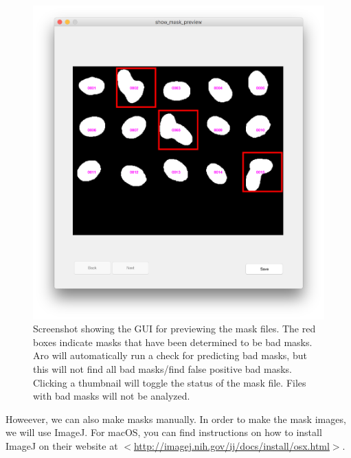 \documentclass[titlepage,11pt]{article}
\begin{document}
\begin{figure}
\centering
\includegraphics[scale=0.45]{show_mask_preview.png}
\caption{Screenshot showing the GUI for previewing the mask files. The red boxes indicate masks that have been determined to be bad masks. Aro will automatically run a check for predicting bad masks, but this will not find all bad masks/find false positive bad masks. Clicking a thumbnail will toggle the status of the mask file. Files with bad masks will not be analyzed.}
\label{fig:showmaskpreview}
\end{figure}

Howeever, we can also make masks manually. In order to make the mask images, we will use ImageJ. For macOS, you can find instructions on how to install ImageJ on their website at $<$\href{http://imagej.nih.gov/ij/docs/install/osx.html}{http://imagej.nih.gov/ij/docs/install/osx.html}$>$.
\end{document}
